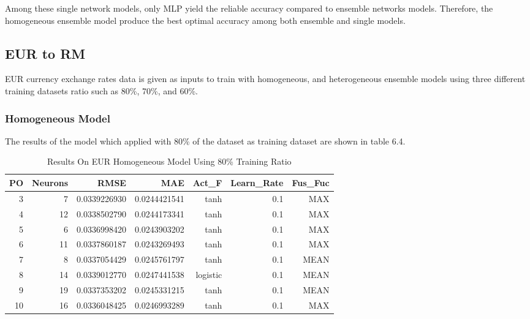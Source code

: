 {{{{{{{{Among these single network models, only MLP yield the reliable accuracy compared to ensemble networks models. Therefore, the homogeneous ensemble model produce the best optimal accuracy among both ensemble and single models.

	
	

	

\subsection{EUR to RM}
EUR currency exchange rates data is given as inputs to train with homogeneous, and heterogeneous ensemble models using three different training datasets ratio such as 80\%, 70\%, and 60\%. 

\subsubsection{Homogeneous Model}

The results of the model which applied with 80\% of the dataset as training dataset are shown in table 6.4. 

\setlength{\tabcolsep}{0.5em} %
{\renewcommand{\arraystretch}{1.2}
	\begin{table}[ht]
		
		\begin{tabular}{@{}rrrrrrr@{}}
			\toprule
			\textbf{PO}&\textbf{Neurons}& \textbf{RMSE} & \textbf{MAE} & \textbf{Act\_F}  & \textbf{Learn\_Rate} &\textbf{ Fus\_Fuc}\\ 
			\midrule
			 3 & 7 & 0.0339226930 & 0.0244421541 & tanh & 0.1 & MAX \\ 
			 4 & 12 & 0.0338502790 & 0.0244173341 & tanh & 0.1 & MAX \\ 
			 5 & 6 & 0.0336998420 & 0.0243903202 & tanh & 0.1& MAX \\ 
			 6 & 11 & 0.0337860187 & 0.0243269493 & tanh & 0.1& MAX \\ 
			 7 & 8 & 0.0337054429 & 0.0245761797 & tanh & 0.1 & MEAN \\ 
			 8 & 14 & 0.0339012770 & 0.0247441538 & logistic & 0.1 & MEAN \\ 
			 9 & 19 & 0.0337353202 & 0.0245331215 & tanh & 0.1& MEAN \\ 
			 10 & 16 & 0.0336048425 & 0.0246993289 & tanh & 0.1 & MAX \\ 
			\hline
		\end{tabular}
		\hspace*{1cm}
		\caption{Results On EUR Homogeneous Model Using 80\% Training Ratio }
	\end{table}	

}}}}}}}}}
